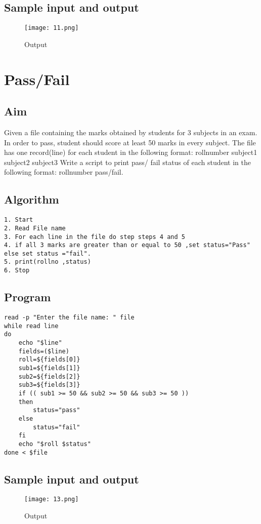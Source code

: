 \documentclass{article}
\begin{document}
\subsection{Sample input and output}
\begin{figure}[H]
    \centering
    \texttt{[image: 11.png]}
    \caption{Output}
    \label{fig:my_label2}
\end{figure}
\section{\Large Pass/Fail}
\subsection{Aim}
Given a file containing the marks obtained by students for 3 subjects in an exam. In order to
pass, student should score at least 50 marks in every subject. The file has one record(line) for
each student in the following format: rollnumber subject1 subject2 subject3 Write a script to
print pass/ fail status of each student in the following format: rollnumber pass/fail.
\subsection{Algorithm}
\begin{Verbatim}[tabsize = 4]
1. Start
2. Read File name
3. For each line in the file do step steps 4 and 5
4. if all 3 marks are greater than or equal to 50 ,set status="Pass" else set status ="fail".
5. print(rollno ,status)
6. Stop
\end{Verbatim}
\subsection{Program}
\begin{Verbatim}[tabsize = 4]
read -p "Enter the file name: " file
while read line 
do
    echo "$line"
    fields=($line)
    roll=${fields[0]}
    sub1=${fields[1]}
    sub2=${fields[2]}
    sub3=${fields[3]}
    if (( sub1 >= 50 && sub2 >= 50 && sub3 >= 50 ))
    then
        status="pass"
    else
        status="fail"
    fi
    echo "$roll $status"
done < $file

\end{Verbatim}
\thispagestyle{third}
\subsection{Sample input and output}
\begin{figure}[H]
    \centering
    \texttt{[image: 13.png]}
    \caption{Output}
    \label{fig:my_label2}
\end{figure}
\end{document}
